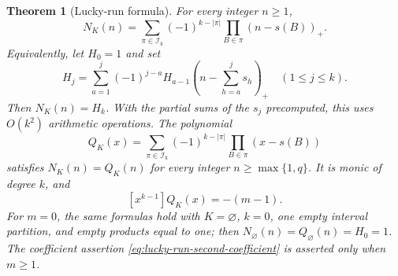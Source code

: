 \documentclass[11pt,a4paper]{article}
\newtheorem{theorem}{Theorem}[section]\newtheorem{lemma}[theorem]{Lemma}\newtheorem{corollary}[theorem]{Corollary}\newtheorem{proposition}[theorem]{Proposition}\theoremstyle{remark}\newtheorem{remark}[theorem]{Remark}\newtheorem{example}[theorem]{Example}
\begin{document}
\begin{theorem}[Lucky-run formula]\label{thm:lucky-run-formula}
For every integer $n\geq1$,
\begin{equation}\label{eq:lucky-run-formula}
 N_K(n)=\sum_{\pi\in\mathcal I_k}(-1)^{k-|\pi|}
              \prod_{B\in\pi}(n-s(B))_+.
\end{equation}
Equivalently, let $H_0=1$ and set
\begin{equation}\label{eq:lucky-run-dp}
 H_j=\sum_{a=1}^{j}(-1)^{j-a}H_{a-1}
        \left(n-\sum_{h=a}^{j}s_h\right)_+
        \quad(1\leq j\leq k).
\end{equation}
Then $N_K(n)=H_k$. With the partial sums of the $s_j$ precomputed,
this uses $O(k^2)$ arithmetic operations.
The polynomial
\begin{equation}\label{eq:lucky-run-polynomial}
 Q_K(x)=\sum_{\pi\in\mathcal I_k}(-1)^{k-|\pi|}
              \prod_{B\in\pi}(x-s(B))
\end{equation}
satisfies $N_K(n)=Q_K(n)$ for every integer
$n\geq\max\{1,q\}$. It is monic of degree $k$, and
\begin{equation}\label{eq:lucky-run-second-coefficient}
 [x^{k-1}]Q_K(x)=-(m-1).
\end{equation}
For $m=0$, the same formulas hold with $K=\varnothing$, $k=0$,
one empty interval partition, and empty products equal to one;
then $N_{\varnothing}(n)=Q_{\varnothing}(n)=H_0=1$.
The coefficient assertion \eqref{eq:lucky-run-second-coefficient}
is asserted only when $m\geq1$.
\end{theorem}
\end{document}
